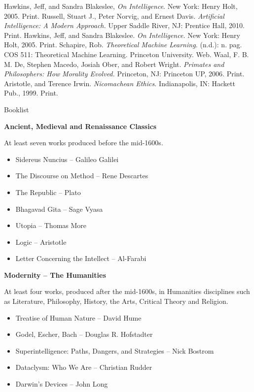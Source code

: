 \documentclass[11pt]{article}
\begin{document}
\newpage

\begin{thebibliography}{9}
	Hawkins, Jeff, and Sandra Blakeslee,
	\emph{On Intelligence}.
	New York: Henry Holt, 2005.
	Print.
	Russell, Stuart J., Peter Norvig, and Ernest Davis.
	\emph{Artificial Intelligence: A Modern Approach.}
	Upper Saddle River, NJ: Prentice Hall, 2010.
	Print.
	Hawkins, Jeff, and Sandra Blakeslee.
	\emph{On Intelligence.}
	New York: Henry Holt, 2005. Print.
	Schapire, Rob.
	\emph{Theoretical Machine Learning.} 
	(n.d.): n. pag. COS 511: Theoretical Machine Learning. Princeton University.
	Web.
	Waal, F. B. M. De, Stephen Macedo, Josiah Ober, and Robert Wright.
	\emph{Primates and Philosophers: How Morality Evolved.}
	Princeton, NJ: Princeton UP, 2006.
	Print.
	Aristotle, and Terence Irwin.
	\emph{Nicomachean Ethics.}
	Indianapolis, IN: Hackett Pub., 1999.
	Print.
\end{thebibliography}

\newpage

{\Large Booklist\\\par}

\par \textbf{Ancient, Medieval and Renaissance Classics}
\par At least seven works produced before the mid-1600s.
\begin{itemize}
	\item Sidereus Nuncius ­-- Galileo Galilei
	\item The Discourse on Method -- Rene Descartes
	\item The Republic -- Plato
	\item Bhagavad Gita -- Sage Vyasa
	\item Utopia -- Thomas More
	\item Logic -- Aristotle
	\item Letter Concerning the Intellect -- Al-Farabi
\end{itemize}

\par \textbf{Modernity -- The Humanities}
\par At least four works, produced after the mid-1600s, in Humanities disciplines such as Literature, Philosophy, History, the Arts, Critical Theory and Religion.
\begin{itemize}
	\item Treatise of Human Nature -- David Hume
	\item Godel, Escher, Bach -- Douglas R. Hofstadter
	\item Superintelligence: Paths, Dangers, and Strategies -- Nick Bostrom
	\item Dataclysm: Who We Are -- Christian Rudder
	\item Darwin's Devices -- John Long
\end{itemize}
\end{document}
